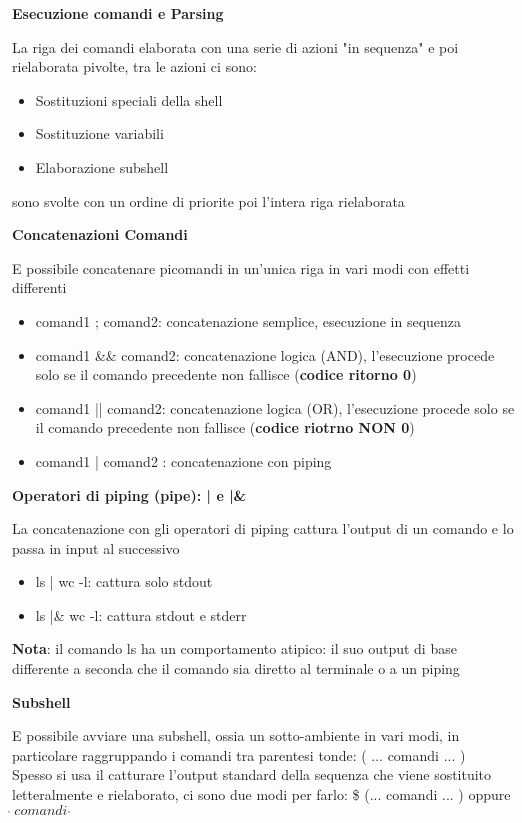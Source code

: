 \begin{flushleft}
  \textbf{Esecuzione comandi e Parsing}\par 
  La riga dei comandi \ace elaborata con una serie di azioni "in sequenza" e poi 
  rielaborata pi\acu volte, tra le azioni ci sono:
  \begin{itemize}
    \item Sostituzioni speciali della shell
    \item Sostituzione variabili
    \item Elaborazione subshell
  \end{itemize}
  sono svolte con un ordine di priorit\aca e poi l'intera riga \ace rielaborata
\end{flushleft}
\begin{flushleft}
  \textbf{Concatenazioni Comandi}\par 
  \ac{E} possibile concatenare pi\acu comandi in un'unica riga in vari modi con effetti differenti 
  \begin{itemize}
    \item comand1 ; comand2: concatenazione semplice, esecuzione in sequenza
    \item comand1 \&\& comand2: concatenazione logica (AND), l'esecuzione procede solo 
          se il comando precedente non fallisce (\textbf{codice ritorno 0})
    \item comand1 || comand2: concatenazione logica (OR), l'esecuzione procede solo 
          se il comando precedente non fallisce (\textbf{codice riotrno NON 0})
    \item comand1 | comand2 : concatenazione con piping
  \end{itemize}
\end{flushleft}
\begin{flushleft}
  \textbf{Operatori di piping (pipe): | e |\&} \par 
  La concatenazione con gli operatori di piping  cattura l'output di un comando e 
  lo passa in input al successivo 
  \begin{itemize}
    \item ls | wc -l: cattura solo stdout
    \item ls |\& wc -l: cattura stdout e stderr
  \end{itemize}
  \textbf{Nota}: il comando ls ha un comportamento atipico: il suo output di base \ace differente 
  a seconda che il comando sia diretto al terminale o a un piping
\end{flushleft}
\begin{flushleft}
  \textbf{Subshell}\par 
  \ac{E} possibile avviare  una subshell, ossia un sotto-ambiente in vari modi, in 
  particolare raggruppando i comandi tra parentesi tonde: ( ... comandi ... )\\
  Spesso si usa il catturare l'output standard della sequenza che viene sostituito letteralmente 
  e rielaborato, ci sono due modi per farlo: \$ (... comandi ... ) oppure $\grave{} \, comandi \,\, \grave{}$
\end{flushleft}
